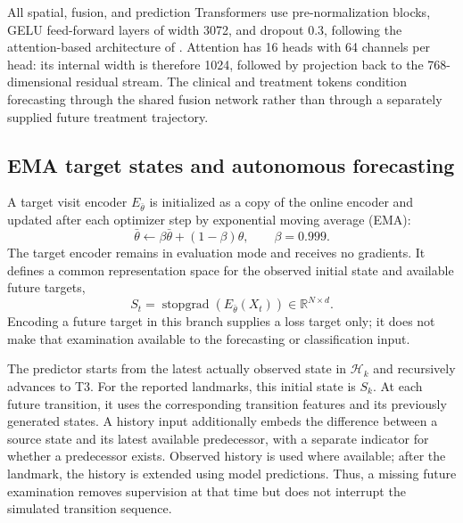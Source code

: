 All spatial, fusion, and prediction Transformers use pre-normalization blocks, GELU feed-forward layers of width 3072, and dropout 0.3, following the attention-based architecture of \citet{vaswani2017}. Attention has 16 heads with 64 channels per head: its internal width is therefore 1024, followed by projection back to the 768-dimensional residual stream. The clinical and treatment tokens condition forecasting through the shared fusion network rather than through a separately supplied future treatment trajectory.

\subsection{EMA target states and autonomous forecasting}
\label{sec:forecasting}
A target visit encoder $E_{\bar\theta}$ is initialized as a copy of the online encoder and updated after each optimizer step by exponential moving average (EMA):
\begin{equation}
 \bar\theta\leftarrow\beta\bar\theta+(1-\beta)\theta,
 \qquad \beta=0.999.
\end{equation}
The target encoder remains in evaluation mode and receives no gradients. It defines a common representation space for the observed initial state and available future targets,
\begin{equation}
 S_t=\operatorname{stopgrad}\!\left(E_{\bar\theta}(X_t)\right)
 \in\mathbb{R}^{N\times d}.
\end{equation}
Encoding a future target in this branch supplies a loss target only; it does not make that examination available to the forecasting or classification input.

The predictor starts from the latest actually observed state in $\mathcal{H}_k$ and recursively advances to T3. For the reported landmarks, this initial state is $S_k$. At each future transition, it uses the corresponding transition features and its previously generated states. A history input additionally embeds the difference between a source state and its latest available predecessor, with a separate indicator for whether a predecessor exists. Observed history is used where available; after the landmark, the history is extended using model predictions. Thus, a missing future examination removes supervision at that time but does not interrupt the simulated transition sequence.

